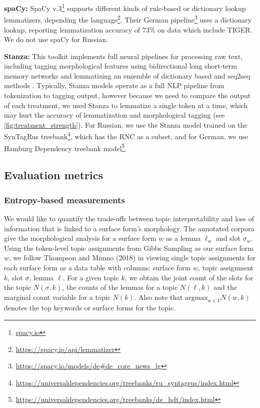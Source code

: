 \documentclass[11pt,a4paper]{article}
\newcommand{\argmax}{\mathrm{argmax}}
\begin{document}
\textbf{spaCy:} SpaCy v.3\footnote{\url{spacy.io}} supports different kinds of rule-based or dictionary lookup lemmatizers, depending the language\footnote{\url{https://spacy.io/api/lemmatizer}}. Their German pipeline\footnote{\url{https://spacy.io/models/de\#de\_core\_news\_lg}} uses a dictionary lookup, reporting lemmatization accuracy of 73\% on data which include TIGER. We do not use spaCy for Russian.


\textbf{Stanza:} This toolkit implements full neural pipelines for processing raw text, including tagging morphological features using bidirectional long short-term memory networks and lemmatizing an ensemble of dictionary based and seq2seq methods \cite{qi2020stanza}. Typically, Stanza models operate as a full NLP pipeline from tokenization to tagging output, however because we need to compare the output of each treatment, we used Stanza to lemmatize a single token at a time, which may hurt the accuracy of lemmatization and morphological tagging (see \ref{fig:treatment_strength}). For Russian, we use the Stanza model trained on the SynTagRus treebank\footnote{\url{https://universaldependencies.org/treebanks/ru_syntagrus/index.html}}, which has the RNC as a subset, and for German, we use Hamburg Dependency treebank model\footnote{\url{https://universaldependencies.org/treebanks/de_hdt/index.html}}.

\subsection{Evaluation metrics}

\subsubsection{Entropy-based measurements}
We would like to quantify the trade-offs between topic interpretability and loss of information that is linked to a surface form's morphology. The annotated corpora give the morphological analysis for a surface form $w$ as a lemma $\ell_w$ and slot $\sigma_w$. Using the token-level topic assignments from Gibbs Sampling as our surface form $w$, we follow Thompson and Mimno (2018) in viewing single topic assignments for each surface form as a data table with columns: surface form $w$, topic assignment $k$, slot $\sigma$, lemma $\ell$. For a given topic $k$, we obtain the joint count of the slots for the topic $N(\sigma, k)$, the counts of the lemmas for a topic $N(\ell, k)$ and the marginal count variable for a topic $N(k)$. Also note that $\argmax_{w \in V} N(w, k)$ denotes the top keywords or surface forms for the topic.
\end{document}
